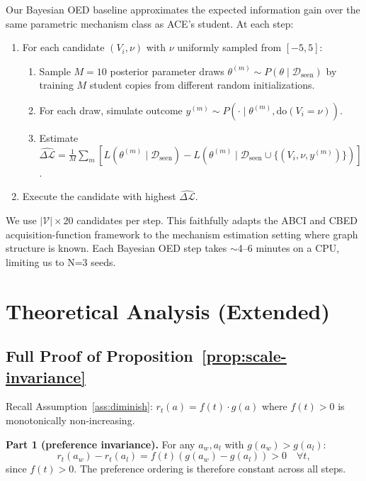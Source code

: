 Our Bayesian OED baseline approximates the expected information gain over the same parametric mechanism class as ACE's student. At each step:
\begin{enumerate}[leftmargin=1.5em]
\item For each candidate $(V_i, \nu)$ with $\nu$ uniformly sampled from $[-5, 5]$:
  \begin{enumerate}
    \item Sample $M=10$ posterior parameter draws $\theta^{(m)} \sim P(\theta \mid \mathcal{D}_\text{seen})$ by training $M$ student copies from different random initializations.
    \item For each draw, simulate outcome $y^{(m)} \sim P(\cdot \mid \theta^{(m)}, \text{do}(V_i = \nu))$.
    \item Estimate $\widehat{\Delta\mathcal{L}} = \frac{1}{M}\sum_m [L(\theta^{(m)} \mid \mathcal{D}_\text{seen}) - L(\theta^{(m)} \mid \mathcal{D}_\text{seen} \cup \{(V_i, \nu, y^{(m)})\})]$.
  \end{enumerate}
\item Execute the candidate with highest $\widehat{\Delta\mathcal{L}}$.
\end{enumerate}
We use $|\mathcal{V}| \times 20$ candidates per step. This faithfully adapts the ABCI \citep{toth2022active} and CBED \citep{tigas2022interventions} acquisition-function framework to the mechanism estimation setting where graph structure is known. Each Bayesian OED step takes $\sim$4--6 minutes on a CPU, limiting us to N=3 seeds.

\section{Theoretical Analysis (Extended)}
\label{app:theory}

\subsection{Full Proof of Proposition~\ref{prop:scale-invariance}}
\label{app:proof}

Recall Assumption~\ref{ass:diminish}: $r_t(a) = f(t) \cdot g(a)$ where $f(t) > 0$ is monotonically non-increasing.

\textbf{Part 1 (preference invariance).} For any $a_w, a_l$ with $g(a_w) > g(a_l)$:
\[r_t(a_w) - r_t(a_l) = f(t)(g(a_w) - g(a_l)) > 0 \quad \forall t,\]
since $f(t) > 0$. The preference ordering is therefore constant across all steps.

